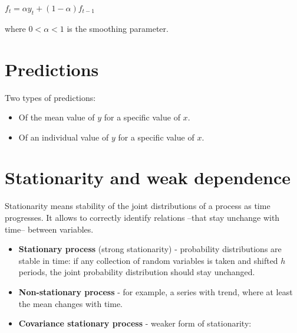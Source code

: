 \documentclass[10pt, a4paper, landscape]{article}
\newcommand{\E}{\mathrm{E}}
\newcommand{\Var}{\mathrm{Var}}
\begin{document}
\begin{multicols}{3}
		\begin{center}
			$f_{t} = \alpha y_{t} + (1 - \alpha) f_{t - 1}$
		\end{center}
		
		where $0 < \alpha < 1$ is the smoothing parameter.
		
		\section*{Predictions}
		
		Two types of predictions:
		
		\begin{itemize}[leftmargin=*]
			\item Of the mean value of $y$ for a specific value of $x$.
			\item Of an individual value of $y$ for a specific value of $x$.
		\end{itemize}
		
		\columnbreak
		
		\section*{Stationarity and weak dependence}
		
		Stationarity means stability of the joint distributions of a process as time progresses. It allows to correctly identify relations --that stay unchange with time-- between variables.
		
		\begin{itemize}[leftmargin=*]
			\item \textbf{Stationary process} (strong stationarity) - probability distributions are stable in time: if any collection of random variables is taken and shifted $h$ periods, the joint probability distribution should stay unchanged.
			\item \textbf{Non-stationary process} - for example, a series with trend, where at least the mean changes with time.
			\item \textbf{Covariance stationary process} - weaker form of stationarity:
			
			\begin{itemize}[leftmargin=*]
				

\end{itemize}
\end{itemize}
\end{multicols}
\end{document}
